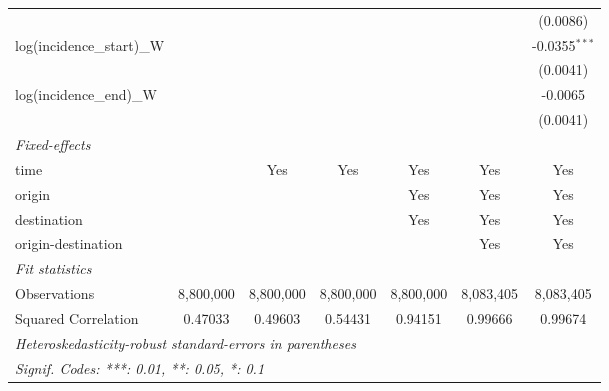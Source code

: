 \documentclass[10pt,a4paper]{article}
\begin{document}
\begin{tabular}{lcccccc}
                                                    &                &                &                 &                &                 & (0.0086)\\   
   log(incidence\_start)\_W                         &                &                &                 &                &                 & -0.0355$^{***}$\\   
                                                    &                &                &                 &                &                 & (0.0041)\\   
   log(incidence\_end)\_W                           &                &                &                 &                &                 & -0.0065\\   
                                                    &                &                &                 &                &                 & (0.0041)\\   
   \midrule
   \emph{Fixed-effects}\\
   time                                             &                & Yes            & Yes             & Yes            & Yes             & Yes\\  
   origin                                           &                &                &                 & Yes            & Yes             & Yes\\  
   destination                                      &                &                &                 & Yes            & Yes             & Yes\\  
   origin-destination                               &                &                &                 &                & Yes             & Yes\\  
   \midrule
   \emph{Fit statistics}\\
   Observations                                     & 8,800,000      & 8,800,000      & 8,800,000       & 8,800,000      & 8,083,405       & 8,083,405\\  
   Squared Correlation                              & 0.47033        & 0.49603        & 0.54431         & 0.94151        & 0.99666         & 0.99674\\  
   \midrule \midrule
   \multicolumn{7}{l}{\emph{Heteroskedasticity-robust standard-errors in parentheses}}\\
   \multicolumn{7}{l}{\emph{Signif. Codes: ***: 0.01, **: 0.05, *: 0.1}}\\
\end{tabular}
\par\endgroup
\end{document}
